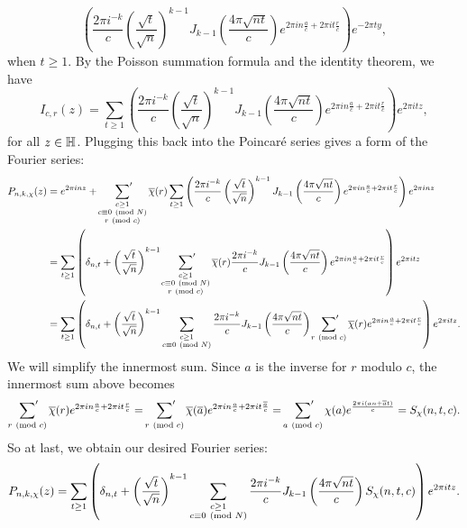     \[
      \left(\frac{2\pi i^{-k}}{c}\left(\frac{\sqrt{t}}{\sqrt{n}}\right)^{k-1}J_{k-1}\left(\frac{4\pi\sqrt{nt}}{c}\right)e^{2\pi in\frac{a}{c}+2\pi it\frac{r}{c}}\right)e^{-2\pi ty},
    \]
    when $t \ge 1$. By the Poisson summation formula and the identity theorem, we have
    \[
      I_{c,r}(z) = \sum_{t \ge 1}\left(\frac{2\pi i^{-k}}{c}\left(\frac{\sqrt{t}}{\sqrt{n}}\right)^{k-1}J_{k-1}\left(\frac{4\pi\sqrt{nt}}{c}\right)e^{2\pi in\frac{a}{c}+2\pi it\frac{r}{c}}\right)e^{2\pi itz},
    \]
    for all $z \in \mathbb{H}$. Plugging this back into the Poincar\'e series gives a form of the Fourier series:
    \begin{align*}
      P_{n,k,\chi}(z) &= e^{2\pi inz}+\sideset{}{'}\sum_{\substack{c \ge 1 \\ c \equiv 0 \ \left(\text{mod }N\right) \\ r \ \left(\text{mod }c\right)}}\overline{\chi}(r)\sum_{t \ge 1}\left(\frac{2\pi i^{-k}}{c}\left(\frac{\sqrt{t}}{\sqrt{n}}\right)^{k-1}J_{k-1}\left(\frac{4\pi\sqrt{nt}}{c}\right)e^{2\pi in\frac{a}{c}+2\pi it\frac{r}{c}}\right)e^{2\pi inz} \\
      &= \sum_{t \ge 1}\left(\delta_{n,t}+\left(\frac{\sqrt{t}}{\sqrt{n}}\right)^{k-1}\sideset{}{'}\sum_{\substack{c \ge 1 \\ c \equiv 0 \ \left(\text{mod }N\right) \\ r \ \left(\text{mod }c\right)}}\overline{\chi}(r)\frac{2\pi i^{-k}}{c}J_{k-1}\left(\frac{4\pi\sqrt{nt}}{c}\right)e^{2\pi in\frac{a}{c}+2\pi it\frac{r}{c}}\right)e^{2\pi itz} \\
      &= \sum_{t \ge 1}\left(\delta_{n,t}+\left(\frac{\sqrt{t}}{\sqrt{n}}\right)^{k-1}\sum_{\substack{c \ge 1 \\ c \equiv 0 \ \left(\text{mod }N\right)}}\frac{2\pi i^{-k}}{c}J_{k-1}\left(\frac{4\pi\sqrt{nt}}{c}\right)\sideset{}{'}\sum_{r \ \left(\text{mod }c\right)}\overline{\chi}(r)e^{2\pi in\frac{a}{c}+2\pi it\frac{r}{c}}\right)e^{2\pi itz}.
    \end{align*}
    We will simplify the innermost sum. Since $a$ is the inverse for $r$ modulo $c$, the innermost sum above becomes
    \begin{equation}\label{equ:Salie_sum_simplification_for_Poincare_series}
      \sideset{}{'}\sum_{r \ \left(\text{mod }c\right)}\overline{\chi}(r)e^{2\pi in\frac{a}{c}+2\pi it\frac{r}{c}} = \sideset{}{'}\sum_{r \ \left(\text{mod }c\right)}\overline{\chi}(\overline{a})e^{2\pi in\frac{a}{c}+2\pi it\frac{\overline{a}}{c}} = \sideset{}{'}\sum_{a \ \left(\text{mod }c\right)}\chi(a)e^{\frac{2\pi i(an+\overline{a}t)}{c}} = S_{\chi}(n,t,c).
    \end{equation}
    So at last, we obtain our desired Fourier series:
    \[
      P_{n,k,\chi}(z) = \sum_{t \ge 1}\left(\delta_{n,t}+\left(\frac{\sqrt{t}}{\sqrt{n}}\right)^{k-1}\sum_{\substack{c \ge 1 \\ c \equiv 0 \ \left(\text{mod }N\right)}}\frac{2\pi i^{-k}}{c}J_{k-1}\left(\frac{4\pi\sqrt{nt}}{c}\right)S_{\chi}(n,t,c)\right)e^{2\pi itz}.
    \]
